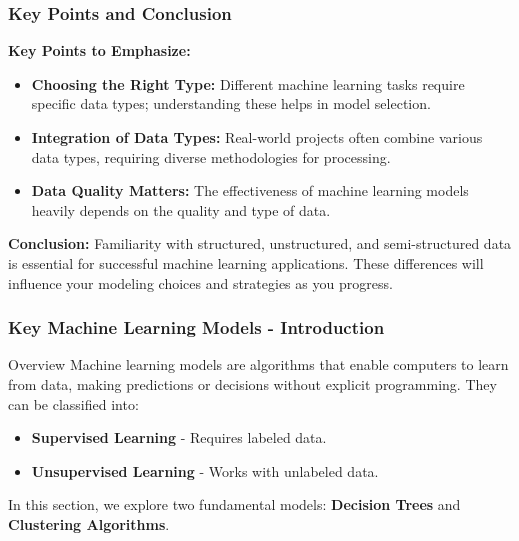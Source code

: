 \documentclass[aspectratio=169]{beamer}
\begin{document}
\begin{frame}[fragile]
    \frametitle{Key Points and Conclusion}
    \textbf{Key Points to Emphasize:}
    \begin{itemize}
        \item \textbf{Choosing the Right Type:} Different machine learning tasks require specific data types; understanding these helps in model selection.
        \item \textbf{Integration of Data Types:} Real-world projects often combine various data types, requiring diverse methodologies for processing.
        \item \textbf{Data Quality Matters:} The effectiveness of machine learning models heavily depends on the quality and type of data.
    \end{itemize}
    
    \textbf{Conclusion:} 
    Familiarity with structured, unstructured, and semi-structured data is essential for successful machine learning applications. These differences will influence your modeling choices and strategies as you progress.
\end{frame}

\begin{frame}[fragile]
    \frametitle{Key Machine Learning Models - Introduction}
    \begin{block}{Overview}
        Machine learning models are algorithms that enable computers to learn from data, making predictions or decisions without explicit programming. They can be classified into:
    \end{block}
    \begin{itemize}
        \item \textbf{Supervised Learning} - Requires labeled data.
        \item \textbf{Unsupervised Learning} - Works with unlabeled data.
    \end{itemize}
    In this section, we explore two fundamental models: \textbf{Decision Trees} and \textbf{Clustering Algorithms}.
\end{frame}
\end{document}
